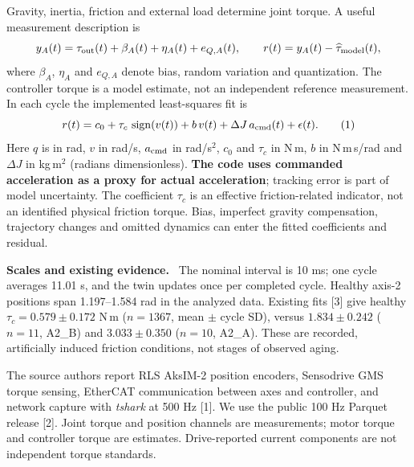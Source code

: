 \documentclass[10pt,letterpaper]{article}
\newcommand{\heading}[1]{\vspace{5pt}{\large\bfseries #1}\par\vspace{1pt}}
\newcommand{\subhead}[1]{\textbf{#1}\ }
\begin{document}
Gravity, inertia, friction and external load determine joint torque. A useful measurement description is
\[
y_A(t)=\tau_{\rm out}(t)+\beta_A(t)+\eta_A(t)+e_{Q,A}(t),
\qquad
r(t)=y_A(t)-\widehat{\tau}_{\rm model}(t),
\]
where $\beta_A$, $\eta_A$ and $e_{Q,A}$ denote bias, random variation and quantization. The controller torque is a model estimate, not an independent reference measurement. In each cycle the implemented least-squares fit is
\[
r(t)=c_0+\tau_c\,\operatorname{sign}(v(t))+b\,v(t)+\Delta J\,a_{\rm cmd}(t)+\epsilon(t).
\tag{1}
\]
Here $q$ is in rad, $v$ in rad/s, $a_{\rm cmd}$ in rad/s$^2$, $c_0$ and $\tau_c$ in N\,m, $b$ in N\,m\,s/rad and $\Delta J$ in kg\,m$^2$ (radians dimensionless). \textbf{The code uses commanded acceleration as a proxy for actual acceleration}; tracking error is part of model uncertainty. The coefficient $\tau_c$ is an effective friction-related indicator, not an identified physical friction torque. Bias, imperfect gravity compensation, trajectory changes and omitted dynamics can enter the fitted coefficients and residual.

\subhead{Scales and existing evidence.}
The nominal interval is 10 ms; one cycle averages 11.01 s, and the twin updates once per completed cycle. Healthy axis-2 positions span 1.197--1.584 rad in the analyzed data. Existing fits [3] give healthy $\tau_c=0.579\pm0.172$ N\,m ($n=1367$, mean $\pm$ cycle SD), versus $1.834\pm0.242$ ($n=11$, A2\_B) and $3.033\pm0.350$ ($n=10$, A2\_A). These are recorded, artificially induced friction conditions, not stages of observed aging.

\heading{2.2 Sensing Sampling and Data Acquisition}
The source authors report RLS AksIM-2 position encoders, Sensodrive GMS torque sensing, EtherCAT communication between axes and controller, and network capture with \emph{tshark} at 500 Hz [1]. We use the public 100 Hz Parquet release [2]. Joint torque and position channels are measurements; motor torque and controller torque are estimates. Drive-reported current components are not independent torque standards.
\end{document}
